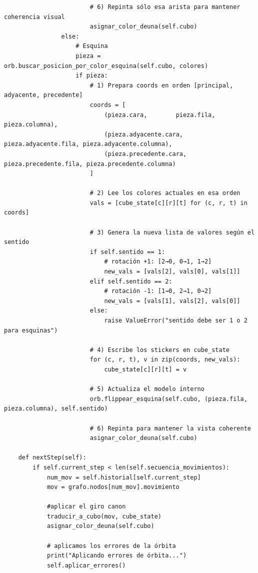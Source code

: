 \begin{lstlisting}
                        # 6) Repinta sólo esa arista para mantener coherencia visual
                        asignar_color_deuna(self.cubo)
                else:
                    # Esquina
                    pieza = orb.buscar_posicion_por_color_esquina(self.cubo, colores)
                    if pieza:
                        # 1) Prepara coords en orden [principal, adyacente, precedente]
                        coords = [
                            (pieza.cara,        pieza.fila,        pieza.columna),
                            (pieza.adyacente.cara, pieza.adyacente.fila, pieza.adyacente.columna),
                            (pieza.precedente.cara, pieza.precedente.fila, pieza.precedente.columna)
                        ]

                        # 2) Lee los colores actuales en esa orden
                        vals = [cube_state[c][r][t] for (c, r, t) in coords]

                        # 3) Genera la nueva lista de valores según el sentido
                        if self.sentido == 1:
                            # rotación +1: [2→0, 0→1, 1→2]
                            new_vals = [vals[2], vals[0], vals[1]]
                        elif self.sentido == 2:
                            # rotación -1: [1→0, 2→1, 0→2]
                            new_vals = [vals[1], vals[2], vals[0]]
                        else:
                            raise ValueError("sentido debe ser 1 o 2 para esquinas")

                        # 4) Escribe los stickers en cube_state
                        for (c, r, t), v in zip(coords, new_vals):
                            cube_state[c][r][t] = v

                        # 5) Actualiza el modelo interno
                        orb.flippear_esquina(self.cubo, (pieza.fila, pieza.columna), self.sentido)

                        # 6) Repinta para mantener la vista coherente
                        asignar_color_deuna(self.cubo)          
              
    def nextStep(self):
        if self.current_step < len(self.secuencia_movimientos):
            num_mov = self.historial[self.current_step]
            mov = grafo.nodos[num_mov].movimiento
            
            #aplicar el giro canon
            traducir_a_cubo(mov, cube_state)
            asignar_color_deuna(self.cubo)
            
            # aplicamos los errores de la órbita
            print("Aplicando errores de órbita...")
            self.aplicar_errores()
            

\end{lstlisting}
